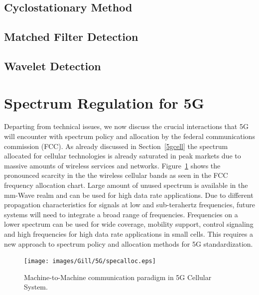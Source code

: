 \subsection{Cyclostationary Method}


\subsection{Matched Filter Detection}


\subsection{Wavelet Detection}

\section{Spectrum Regulation for 5G}

Departing from technical issues, we now discuss the crucial interactions that 5G will encounter with spectrum policy and allocation by the federal communications commission (FCC). As already discussed in Section~\ref{5gcell} the spectrum allocated for cellular technologies is already saturated in peak markets due to massive amounts of wireless services and networks. Figure~\ref{specalloc} shows the pronounced scarcity in the the wireless cellular bands as seen in the FCC frequency allocation chart. Large amount of unused spectrum is available in the mm-Wave realm and can be used for high data rate applications. Due to different propagation characteristics for signals at low and sub-terahertz frequencies, future systems will need to integrate a broad range of frequencies. Frequencies on a lower spectrum can be used for wide coverage, mobility support, control signaling and high frequencies for high data rate applications in small cells. This requires a new approach to spectrum policy and allocation methods for 5G standardization.

\begin{figure}[!ht]
	\centering
\texttt{[image: images/Gill/5G/specalloc.eps]}
	\caption{Machine-to-Machine communication paradigm in 5G Cellular System.}
	\label{specalloc}
\end{figure}

